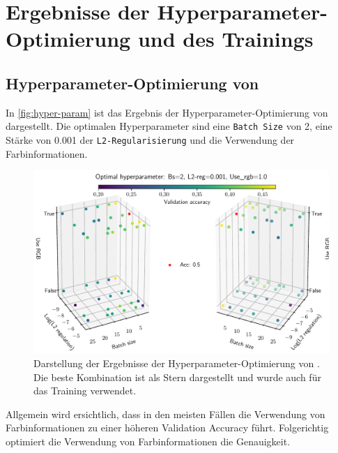\section{Ergebnisse der Hyperparameter-Optimierung und des Trainings}
\subsection{Hyperparameter-Optimierung von \MiniDog{}}

In \autoref{fig:hyper-param} ist das Ergebnis der Hyperparameter-Optimierung von \MiniDog{}
dargestellt. Die optimalen Hyperparameter sind eine \texttt{Batch Size} von 2,
eine Stärke von 0.001 der \texttt{L2-Regularisierung} und die Verwendung
der Farbinformationen.

\begin{figure}
  \centering
  \includegraphics[scale=0.6]{pics/ergebnisse/hyper_raum.pdf}
  \caption{Darstellung der Ergebnisse der Hyperparameter-Optimierung
  von \MiniDog{}. Die beste Kombination ist als Stern dargestellt und wurde auch
  für das Training verwendet.}
  \label{fig:hyper-param}
\end{figure}

Allgemein wird ersichtlich, dass in den meisten Fällen die Verwendung von Farbinformationen
zu einer höheren Validation Accuracy führt. Folgerichtig optimiert die Verwendung
von Farbinformationen die Genauigkeit.

\subsection{\MiniDog}


